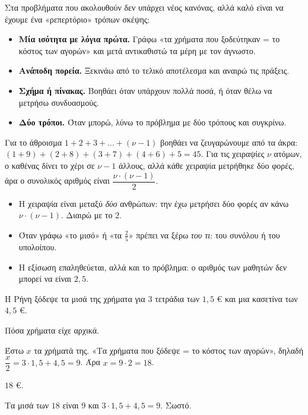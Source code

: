 Στα προβλήματα που ακολουθούν δεν υπάρχει νέος κανόνας, αλλά καλό είναι να έχουμε ένα «ρεπερτόριο» τρόπων σκέψης:
\begin{itemize}[leftmargin=1.2em,itemsep=0.3ex,topsep=2pt]
\item \textbf{Μία ισότητα με λόγια πρώτα.} Γράφω «τα χρήματα που ξοδεύτηκαν = το κόστος των αγορών» και μετά αντικαθιστώ τα μέρη με τον άγνωστο.
\item \textbf{Ανάποδη πορεία.} Ξεκινάω από το τελικό αποτέλεσμα και αναιρώ τις πράξεις.
\item \textbf{Σχήμα ή πίνακας.} Βοηθάει όταν υπάρχουν πολλά ποσά, ή όταν θέλω να μετρήσω συνδυασμούς.
\item \textbf{Δύο τρόποι.} Όταν μπορώ, λύνω το πρόβλημα με δύο τρόπους και συγκρίνω.
\end{itemize}
Για το άθροισμα $1+2+3+\dots+(\nu-1)$ βοηθάει να ζευγαρώνουμε από τα άκρα: $(1+9)+(2+8)+(3+7)+(4+6)+5=45$. Για τις χειραψίες $\nu$ ατόμων, ο καθένας δίνει το χέρι σε $\nu-1$ άλλους, αλλά κάθε χειραψία μετρήθηκε δύο φορές, άρα ο συνολικός αριθμός είναι $\dfrac{\nu\cdot(\nu-1)}{2}$.

\begin{prosoxi}
\begin{itemize}[leftmargin=1.2em,itemsep=0.3ex,topsep=2pt]
\item Η χειραψία είναι μεταξύ \emph{δύο} ανθρώπων: την έχω μετρήσει δύο φορές αν κάνω $\nu\cdot(\nu-1)$. Διαιρώ με το $2$.
\item Όταν γράφω «το μισό» ή «τα $\frac{2}{5}$» πρέπει να ξέρω \emph{του τι}: του συνόλου ή του υπολοίπου.
\item Η εξίσωση επαληθεύεται, αλλά και το πρόβλημα: ο αριθμός των μαθητών δεν μπορεί να είναι $2{,}5$.
\end{itemize}
\end{prosoxi}


\tixero Η Ρήνη ξόδεψε τα μισά της χρήματα για $3$ τετράδια των $1{,}5$ € και μια κασετίνα των $4{,}5$ €.\par
\tithelo Πόσα χρήματα είχε αρχικά.\par
\possindeo Έστω $x$ τα χρήματά της. «Τα χρήματα που ξόδεψε = το κόστος των αγορών», δηλαδή $\dfrac{x}{2}=3\cdot1{,}5+4{,}5=9$. Άρα $x=9\cdot2=18$.\par
\apantisi $18$ €.\par
\elegxos Τα μισά των $18$ είναι $9$ και $3\cdot1{,}5+4{,}5=9$. Σωστό.

